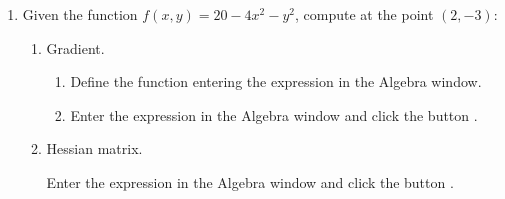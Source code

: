 \begin{enumerate}[leftmargin=*]
\item Given the function $f(x,y)=20-4x^2-y^2$, compute at the point $(2,-3)$:
\begin{enumerate}
\item Gradient.
\begin{indication}
\begin{enumerate}
\item Define the function entering the expression  in the Algebra window.
\item Enter the expression  in the Algebra window and click the button .
\end{enumerate}
\end{indication}

\item Hessian matrix.
\begin{indication}
Enter the expression  in the Algebra window and click the button .
\end{indication}


\end{enumerate}
\end{enumerate}
